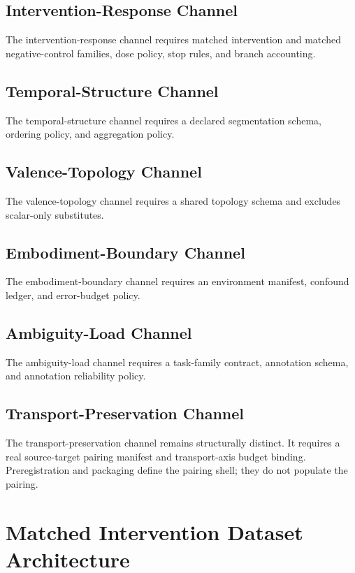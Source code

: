 \documentclass[11pt,a4paper]{article}
\begin{document}
\subsection{Intervention-Response Channel}

The intervention-response channel requires matched intervention and matched
negative-control families, dose policy, stop rules, and branch accounting.

\subsection{Temporal-Structure Channel}

The temporal-structure channel requires a declared segmentation schema, ordering
policy, and aggregation policy.

\subsection{Valence-Topology Channel}

The valence-topology channel requires a shared topology schema and excludes
scalar-only substitutes.

\subsection{Embodiment-Boundary Channel}

The embodiment-boundary channel requires an environment manifest, confound
ledger, and error-budget policy.

\subsection{Ambiguity-Load Channel}

The ambiguity-load channel requires a task-family contract, annotation schema,
and annotation reliability policy.

\subsection{Transport-Preservation Channel}

The transport-preservation channel remains structurally distinct. It requires a
real source-target pairing manifest and transport-axis budget binding. Preregistration and packaging
define the pairing shell; they do not populate the pairing.

\section{Matched Intervention Dataset Architecture}
\end{document}
